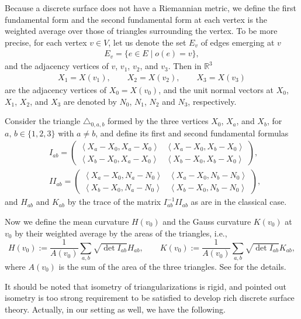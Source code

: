 \documentclass[10pt,a4paper]{amsart}
\newcommand{\R}{\mathbb{R}}
\newcommand{\1}{{\bf 1}}
\newcommand{\inner}[2]{{\left\langle{#1}, {#2}\right\rangle}}
\numberwithin{equation}{section}
\begin{document}
Because a discrete surface does not have a Riemannian metric,
we define the first fundamental form and the second fundamental form at each vertex is
the weighted average over those of triangles surrounding the vertex. To be more precise,
for each vertex $v \in V$, let us denote the set $E_v$ of edges emerging at $v$
\begin{gather*}
 E_v = \{ e \in E \mid o(e ) =v \},
\end{gather*}
and the adjacency vertices of $v$, $v_1$, $v_2$, and $v_3$.
Then in $\R^3$
\begin{gather*}
 X_1 = X (v_1),
 \qquad
 X_2 = X (v_2),
 \qquad
 X_3 = X (v_3)
\end{gather*}
are the adjacency vertices of $X_0= X(v_0)$,
and the unit normal vectors at $X_0$, $X_1$, $X_2$, and $X_3$ are denoted by $N_0$, $N_1$, $N_2$ and $N_3$, respectively.

Consider the triangle $\triangle_{0,a,b}$ formed by the three vertices $X_0$, $X_a$, and $X_b$,
for $a,\,b \in \{1,2,3\}$ with $a\neq b$, and define its first and second fundamental formulas
 \begin{align*}
 & I_{ab}
=
 \begin{pmatrix}
 \inner{X_a-X_0}{X_a-X_0} & \inner{X_a-X_0}{X_b-X_0} \\
 \inner{X_b-X_0}{X_a-X_0} & \inner{X_b-X_0}{X_b-X_0}
 \end{pmatrix},
 \\
 & I\!I_{ab}
 =
 \begin{pmatrix}
 \inner{X_a-X_0}{N_a-N_0} & \inner{X_a-X_0}{N_b-N_0} \\
 \inner{X_b-X_0}{N_a-N_0} & \inner{X_b-X_0}{N_b-N_0}
 \end{pmatrix},
 \end{align*}
and $H_{ab}$ and $K_{ab}$ by the trace of the matrix $I_{ab}^{-1}I\!I_{ab}$ as are in the classical case.

Now we define the mean curvature $H(v_0)$ and the Gauss curvature $K(v_0)$ at $v_0$
by their weighted average by the areas of the triangles,
i.e.,
\[
 H(v_0) := \frac{1}{A(v_0)}\sum_{a,b} \sqrt{\det I_{ab}}H_{ab},
 \qquad
 K(v_0) := \frac{1}{A(v_0)}\sum_{a,b} \sqrt{\det I_{ab}}K_{ab},
 \]
where $A(v_0)$ is the sum of the area of the three triangles.
See \cite{kotani-naito-omori} for the details.

It should be noted that isometry of triangularizations is rigid,
and \cite{lam-pinkall} pointed out isometry is too strong requirement to be satisfied
to develop rich discrete surface theory. Actually, in our setting as well, we have the following.
\end{document}
